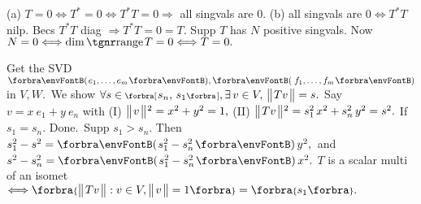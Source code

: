 
(a) $T=0\Longleftrightarrow T^*=0\Longleftrightarrow T^*T=0\Rightarrow$ all singvals are $0.$\parSol{}
(b) all singvals are $0\Longleftrightarrow T^*T$ nilp. Becs $T^*T$ diag $\Rightarrow T^*T=0=T.$\PfEnd\vspace{2pt}\parSol{}
\Or Supp $T$ has $N$ positive singvals. Now $N=0\Longleftrightarrow\dim\range T=0\Longleftrightarrow T=0.$\PfEnd
\SepLine

Get the SVD $\Par{e_1,\dots,e_m},\Par{\,f_1,\dots,f_m}$ in $V,W.$ \,We show $\forall s\in\;\!\!\Interval{[}{]}{s_n,\,s_1},\exists\,v\in V,\,\Dvert{Tv}=s.$\vspace{1pt}\parSol{}
Say $v=x\:\!e_1+y\:\!e_n$ with (I) $\big\Vert\hspace{1pt}{}v{}\hspace{1pt}\big\Vert{\hspace{0.5pt}}{^2}=x^2+y^2=1,$ (II) $\big\Vert\hspace{1pt}{}Tv{}\hspace{1pt}\big\Vert{\hspace{0.5pt}}{^2}=s_1^2\,x^2+s_n^2\,y^2=s^2.$\vspace{1pt}\parSol{}
If $s_1=s_n.$ Done. \,Supp $s_1>s_n.$ Then \,$s_1^2-s^2=\Par{s_1^2-s_n^2}\,y^2,$ \,and \:$s^2-s_n^2=\Par{s_1^2-s_n^2}\,x^2.$\PfEnd\vspace{3pt}
\AComm $T$ is a scalar multi of an isomet $\Longleftrightarrow\Bra{\Dvert{Tv}:v\in V,\Dvert{v}=1}=\Bra{s_1}.$
\SepLine


